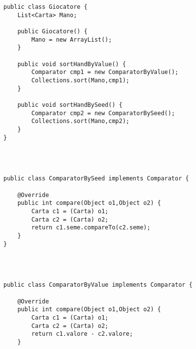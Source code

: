 \documentclass[10pt,a4paper]{article}
\begin{document}
\begin{verbatim}
public class Giocatore {
    List<Carta> Mano;
    
    public Giocatore() {
        Mano = new ArrayList();
    }

    public void sortHandByValue() {
        Comparator cmp1 = new ComparatorByValue();
        Collections.sort(Mano,cmp1);
    }
    
    public void sortHandBySeed() {
        Comparator cmp2 = new ComparatorBySeed();
        Collections.sort(Mano,cmp2);
    }
}

\end{verbatim}
\\\\
\begin{verbatim}
public class ComparatorBySeed implements Comparator {
    
    @Override
    public int compare(Object o1,Object o2) {
        Carta c1 = (Carta) o1;
        Carta c2 = (Carta) o2;
        return c1.seme.compareTo(c2.seme);
    }
}

\end{verbatim}
\\\\
\begin{verbatim}
public class ComparatorByValue implements Comparator {
    
    @Override
    public int compare(Object o1,Object o2) {
        Carta c1 = (Carta) o1;
        Carta c2 = (Carta) o2;
        return c1.valore - c2.valore;
    } 

\end{verbatim}
\newpage
\end{document}
